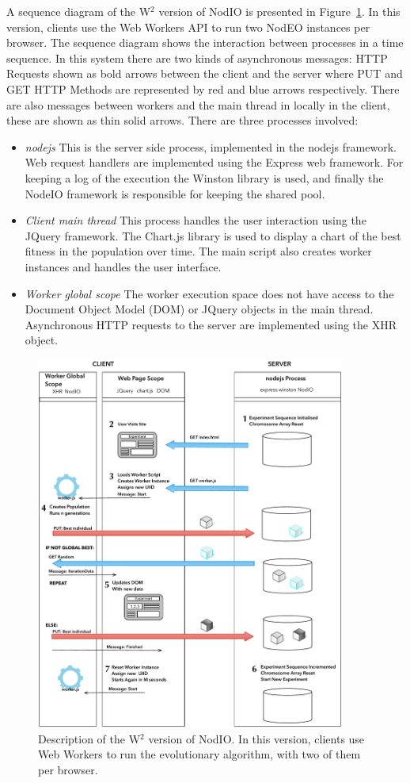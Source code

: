 \documentclass[journal,onecolumn]{IEEEtran}
\begin{document}
A sequence diagram of the W$^2$ version of {\sf NodIO} is presented
in Figure~\ref{fig:system:w2}. In this version, clients use the Web Workers
API to run two NodEO instances per browser. The sequence diagram shows the
interaction between processes in a time sequence. In this system there are
two kinds of asynchronous messages: HTTP Requests shown as bold arrows between
the client and the server where PUT and GET HTTP Methods are represented by
red and blue arrows respectively. There are also messages between workers and
the main thread in locally in the client, these are shown as thin solid arrows.
There are three processes involved:
\begin{itemize}
\item {\em nodejs} This is the server side process, implemented in the nodejs %
framework. Web request handlers are implemented using the Express web
framework. For keeping a log of the execution the Winston library is used, and
finally the NodeIO framework is responsible for keeping the shared pool.
\item {\em Client main thread}  This process handles the user interaction
using the JQuery framework. The Chart.js library is used to display a chart of
the best fitness in the population over time. The main script also creates
worker instances and handles the user interface.
\item {\em Worker global scope} The worker execution space does not have
access to the Document Object Model (DOM) or JQuery objects in the main thread.
Asynchronous HTTP requests to the server are implemented using the XHR object. %
\end{itemize}
%
\begin{figure}[!htb]
\centering
\includegraphics[width=4in]{img/Algorithm.pdf}
\caption{Description of the W$^2$ version of {\sf NodIO}. In this
  version, clients use Web Workers to run the evolutionary algorithm,
  with two of them per browser.}
\label{fig:system:w2}
\end{figure}
\end{document}
